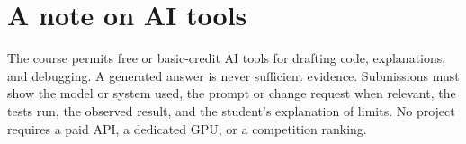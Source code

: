\section*{A note on AI tools}
The course permits free or basic-credit AI tools for drafting code, explanations, and debugging. A generated answer is never sufficient evidence. Submissions must show the model or system used, the prompt or change request when relevant, the tests run, the observed result, and the student's explanation of limits. No project requires a paid API, a dedicated GPU, or a competition ranking.

